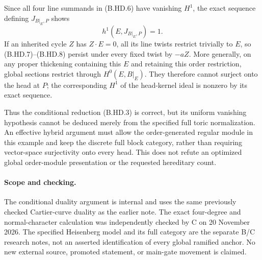 Since all four line summands in (B.HD.6) have vanishing $H^1$,
the exact sequence defining $J_{B|_E,P}$ shows
\[
                         h^1(E,J_{B|_E,P})=1.          \tag{B.HD.8}
\]
If an inherited cycle $Z$ has $Z\cdot E=0$, all its line twists
restrict trivially to $E$, so (B.HD.7)--(B.HD.8) persist under every
fixed twist by $-aZ$.  More generally, on any proper thickening
containing this $E$ and retaining this order restriction, global
sections restrict through $H^0(E,B|_E)$.  They therefore cannot
surject onto the head at $P$; the corresponding $H^1$ of the
head-kernel ideal is nonzero by its exact sequence.

Thus the conditional reduction (B.HD.3) is correct, but its uniform
vanishing hypothesis cannot be deduced merely from the specified
full toric normalization.  An effective hybrid argument must allow
the order-generated regular module in this example and keep the
discrete full block category, rather than requiring vector-space
surjectivity onto every head.  This does not refute an optimized
global order-module presentation or the requested hereditary count.

\paragraph{Scope and checking.}
The conditional duality argument is internal and uses the same
previously checked Cartier-curve duality as the earlier note.
The exact four-degree and normal-character calculation was
independently checked by C on 20 November 2026.  The specified
Heisenberg model and its full category are the separate B/C
research notes, not an asserted identification of every global
ramified anchor.  No new external source, promoted statement,
or main-gate movement is claimed.

